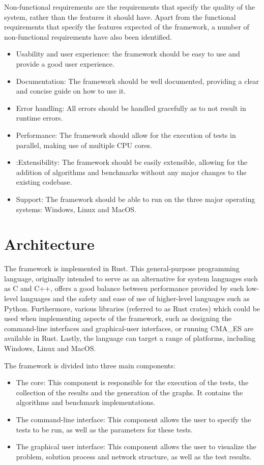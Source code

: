 Non-functional requirements are the requirements that specify the quality of the system, rather than the features it should have.
Apart from the functional requirements that specify the features expected of the framework, a number of non-functional requirements have also been identified.

\begin{itemize}
    \item Usability and user experience: the framework should be easy to use and provide a good user experience.
    \item Documentation: The framework should be well documented, providing a clear and concise guide on how to use it.
    \item Error handling: All errors should be handled gracefully as to not result in runtime errors.
    \item Performance: The framework should allow for the execution of tests in parallel, making use of multiple CPU cores.
    \item:Extensibility: The framework should be easily extensible, allowing for the addition of algorithms and benchmarks without any
    major changes to the existing codebase.
    \item Support: The framework should be able to run on the three major operating systems: Windows, Linux and MacOS.
\end{itemize}

\section{Architecture}

The framework is implemented in Rust. This general-purpose programming language, originally intended to serve as an alternative for system languages such as C and
C++, offers a good balance between performance provided by such low-level languages and the safety and ease of use of higher-level languages such as Python.
Furthermore, various libraries (referred to as Rust crates) which could be used when implementing aspects of the framework, such as designing the command-line interfaces
and graphical-user interfaces, or running CMA\_ES are available in Rust.
Lastly, the language can target a range of platforms, including Windows, Linux and MacOS.

The framework is divided into three main components:

\begin{itemize}
    \item The core: This component is responsible for the execution of the tests, the collection of the results and the generation of the graphs. It contains
        the algorithms and benchmark implementations.
    \item The command-line interface: This component allows the user to specify the tests to be run, as well as the parameters for these tests.
    \item The graphical user interface: This component allows the user to visualize the problem, solution process and network structure, as well as the test results.
\end{itemize}

